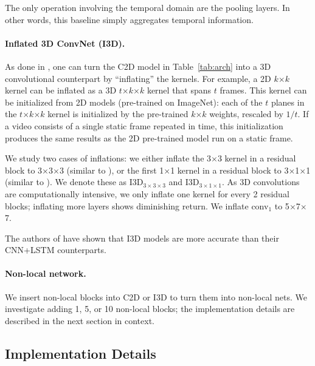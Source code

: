 \documentclass[10pt,twocolumn,letterpaper]{article}
\def\x{$\times$}
\begin{document}
The only operation involving the temporal domain are the pooling layers. In other words, this baseline simply aggregates temporal information.

\paragraph{Inflated 3D ConvNet (I3D).} As done in \cite{Feichtenhofer2016,Carreira2017}, one can turn the C2D model in Table~\ref{tab:arch} into a 3D convolutional counterpart by ``inflating'' the kernels. For example, a 2D $k$\x$k$ kernel can be inflated as a 3D $t$\x$k$\x$k$ kernel that spans $t$ frames. This kernel can be initialized from 2D models (pre-trained on ImageNet): each of the $t$ planes in the $t$\x$k$\x$k$ kernel is initialized by the pre-trained $k$\x$k$ weights, rescaled by $1/t$. If a video consists of a single static frame repeated in time, this initialization produces the same results as the 2D pre-trained model run on a static frame.

We study two cases of inflations: we either inflate the 3\x3 kernel in a residual block to 3\x3\x3 (similar to \cite{Carreira2017}), or the first 1\x1 kernel in a residual block to 3\x1\x1 (similar to \cite{Feichtenhofer2016}). We denote these as I3D$_{3\times3\times3}$ and I3D$_{3\times1\times1}$. As 3D convolutions are computationally intensive, we only inflate one kernel for every 2 residual blocks; inflating more layers shows diminishing return.
We inflate conv$_1$ to 5\x7\x7.

The authors of \cite{Carreira2017} have shown that I3D models are more accurate than their CNN+LSTM counterparts.

\paragraph{Non-local network.} We insert non-local blocks into C2D or I3D to turn them into non-local nets. We investigate adding 1, 5, or 10 non-local blocks; the implementation details are described in the next section in context.

\subsection{Implementation Details}
\end{document}
